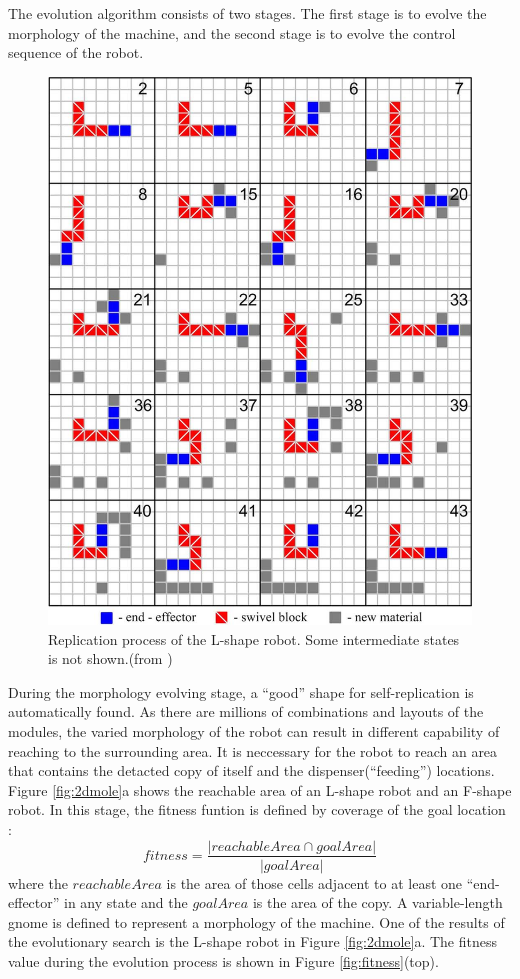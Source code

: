 \documentclass[12pt,twoside]{article}
\theoremstyle{plain}
\theoremstyle{definition}
\theoremstyle{remark}
\begin{document}
The evolution algorithm consists of two stages. The first stage is to evolve the morphology of the machine, and the second stage is to evolve the control sequence of the robot.

\begin{figure}[hbtp]
	 \centerline{\includegraphics[width=.6\textwidth]{zykov-279}}
	 {\caption{Replication process of the L-shape robot. Some intermediate states is not shown.(from \cite{zykov_evolved_2007})}
	 \label{fig:l-repproc}}
\end{figure}

During the morphology evolving stage, a ``good'' shape for self-replication is automatically found. As there are millions of combinations and layouts of the modules, the varied morphology of the robot can result in different capability of reaching to the surrounding area. It is neccessary for the robot to reach an area that contains the detacted copy of itself and the dispenser(``feeding'') locations. Figure \ref{fig:2dmole}a shows the reachable area of an L-shape robot and an F-shape robot. In this stage, the fitness funtion is defined by coverage of the goal location :
\[ fitness = \frac{|reachableArea \cap goalArea|}{|goalArea|} \] where the $reachableArea$ is the area of those cells adjacent to at least one ``end-effector'' in any state and the $goalArea$ is the area of the copy. A variable-length gnome is defined to represent a morphology of the machine. One of the results of the evolutionary search is the L-shape robot in Figure \ref{fig:2dmole}a. The fitness value during the evolution process is shown in Figure \ref{fig:fitness}(top).
\end{document}

